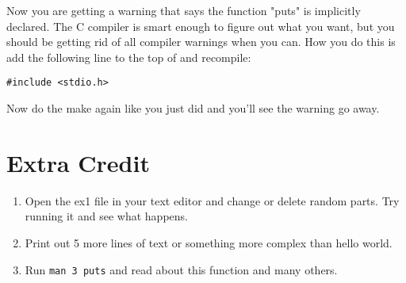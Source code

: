 Now you are getting a warning that says the function "puts" is implicitly declared.
The C compiler is smart enough to figure out what you want, but you should be
getting rid of all compiler warnings when you can.  How you do this is add the
following line to the top of  and recompile:

\begin{lstlisting}
#include <stdio.h>
\end{lstlisting}

Now do the make again like you just did and you'll see the warning go away.

\section{Extra Credit}

\begin{enumerate}
\item Open the ex1 file in your text editor and change or delete random parts.  Try running it and see what happens.
\item Print out 5 more lines of text or something more complex than hello world.
\item Run \verb|man 3 puts| and read about this function and many others.
\end{enumerate}



